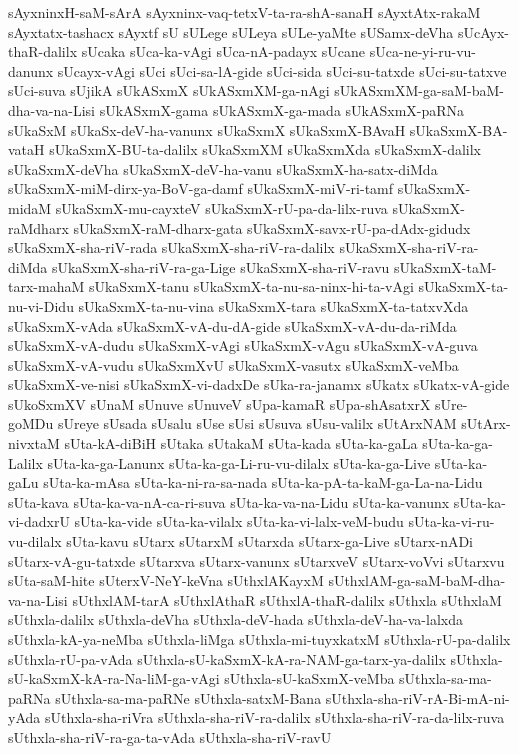 {sAyxninxH-saM-sArA
sAyxninx-vaq-tetxV-ta-ra-shA-sanaH
sAyxtAtx-rakaM
sAyxtatx-tashacx
sAyxtf
sU
sULege
sULeya
sULe-yaMte
sUSamx-deVha
sUcAyx-thaR-dalilx
sUcaka
sUca-ka-vAgi
sUca-nA-padayx
sUcane
sUca-ne-yi-ru-vu-danunx
sUcayx-vAgi
sUci
sUci-sa-lA-gide
sUci-sida
sUci-su-tatxde
sUci-su-tatxve
sUci-suva
sUjikA
sUkASxmX
sUkASxmXM-ga-nAgi
sUkASxmXM-ga-saM-baM-dha-va-na-Lisi
sUkASxmX-gama
sUkASxmX-ga-mada
sUkASxmX-paRNa
sUkaSxM
sUkaSx-deV-ha-vanunx
sUkaSxmX
sUkaSxmX-BAvaH
sUkaSxmX-BA-vataH
sUkaSxmX-BU-ta-dalilx
sUkaSxmXM
sUkaSxmXda
sUkaSxmX-dalilx
sUkaSxmX-deVha
sUkaSxmX-deV-ha-vanu
sUkaSxmX-ha-satx-diMda
sUkaSxmX-miM-dirx-ya-BoV-ga-damf
sUkaSxmX-miV-ri-tamf
sUkaSxmX-midaM
sUkaSxmX-mu-cayxteV
sUkaSxmX-rU-pa-da-lilx-ruva
sUkaSxmX-raMdharx
sUkaSxmX-raM-dharx-gata
sUkaSxmX-savx-rU-pa-dAdx-gidudx
sUkaSxmX-sha-riV-rada
sUkaSxmX-sha-riV-ra-dalilx
sUkaSxmX-sha-riV-ra-diMda
sUkaSxmX-sha-riV-ra-ga-Lige
sUkaSxmX-sha-riV-ravu
sUkaSxmX-taM-tarx-mahaM
sUkaSxmX-tanu
sUkaSxmX-ta-nu-sa-ninx-hi-ta-vAgi
sUkaSxmX-ta-nu-vi-Didu
sUkaSxmX-ta-nu-vina
sUkaSxmX-tara
sUkaSxmX-ta-tatxvXda
sUkaSxmX-vAda
sUkaSxmX-vA-du-dA-gide
sUkaSxmX-vA-du-da-riMda
sUkaSxmX-vA-dudu
sUkaSxmX-vAgi
sUkaSxmX-vAgu
sUkaSxmX-vA-guva
sUkaSxmX-vA-vudu
sUkaSxmXvU
sUkaSxmX-vasutx
sUkaSxmX-veMba
sUkaSxmX-ve-nisi
sUkaSxmX-vi-dadxDe
sUka-ra-janamx
sUkatx
sUkatx-vA-gide
sUkoSxmXV
sUnaM
sUnuve
sUnuveV
sUpa-kamaR
sUpa-shAsatxrX
sUre-goMDu
sUreye
sUsada
sUsalu
sUse
sUsi
sUsuva
sUsu-valilx
sUtArxNAM
sUtArx-nivxtaM
sUta-kA-diBiH
sUtaka
sUtakaM
sUta-kada
sUta-ka-gaLa
sUta-ka-ga-Lalilx
sUta-ka-ga-Lanunx
sUta-ka-ga-Li-ru-vu-dilalx
sUta-ka-ga-Live
sUta-ka-gaLu
sUta-ka-mAsa
sUta-ka-ni-ra-sa-nada
sUta-ka-pA-ta-kaM-ga-La-na-Lidu
sUta-kava
sUta-ka-va-nA-ca-ri-suva
sUta-ka-va-na-Lidu
sUta-ka-vanunx
sUta-ka-vi-dadxrU
sUta-ka-vide
sUta-ka-vilalx
sUta-ka-vi-lalx-veM-budu
sUta-ka-vi-ru-vu-dilalx
sUta-kavu
sUtarx
sUtarxM
sUtarxda
sUtarx-ga-Live
sUtarx-nADi
sUtarx-vA-gu-tatxde
sUtarxva
sUtarx-vanunx
sUtarxveV
sUtarx-voVvi
sUtarxvu
sUta-saM-hite
sUterxV-NeY-keVna
sUthxlAKayxM
sUthxlAM-ga-saM-baM-dha-va-na-Lisi
sUthxlAM-tarA
sUthxlAthaR
sUthxlA-thaR-dalilx
sUthxla
sUthxlaM
sUthxla-dalilx
sUthxla-deVha
sUthxla-deV-hada
sUthxla-deV-ha-va-lalxda
sUthxla-kA-ya-neMba
sUthxla-liMga
sUthxla-mi-tuyxkatxM
sUthxla-rU-pa-dalilx
sUthxla-rU-pa-vAda
sUthxla-sU-kaSxmX-kA-ra-NAM-ga-tarx-ya-dalilx
sUthxla-sU-kaSxmX-kA-ra-Na-liM-ga-vAgi
sUthxla-sU-kaSxmX-veMba
sUthxla-sa-ma-paRNa
sUthxla-sa-ma-paRNe
sUthxla-satxM-Bana
sUthxla-sha-riV-rA-Bi-mA-ni-yAda
sUthxla-sha-riVra
sUthxla-sha-riV-ra-dalilx
sUthxla-sha-riV-ra-da-lilx-ruva
sUthxla-sha-riV-ra-ga-ta-vAda
sUthxla-sha-riV-ravU
}
